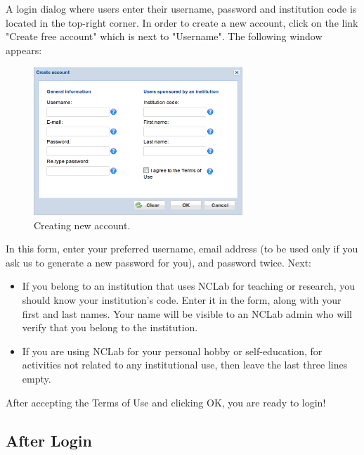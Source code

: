 \documentclass[article,A4,12pt]{llncs}
\begin{document}
A login dialog where
users enter their username, password and institution code is located in the 
top-right corner. In order to create a new account, click on the link "Create free account" which is next to
"Username". The following window appears:

\newpage

\begin{figure}[!ht]
\begin{center}
\includegraphics[width=0.7\textwidth]{img/create-account.png}
\end{center}
\vspace{-4mm}
\caption{Creating new account.}
\label{fig:creacc}
\end{figure}

\noindent
In this form, enter your preferred username, email address (to be used only if you ask
us to generate a new password for you), and password twice. Next:

\begin{itemize}
\item If you belong to an institution 
      that uses NCLab for teaching or research, you should know your institution's code. Enter it in the form, 
      along with your first and last names. Your name will be visible to an NCLab admin
      who will verify that you belong to the institution.
\item If you are using NCLab for your personal hobby or self-education, for activities not 
      related to any institutional use, then leave the last three lines empty. 
\end{itemize}
After accepting the Terms of Use and clicking OK, you are ready to login!

\subsection{After Login}
\end{document}

